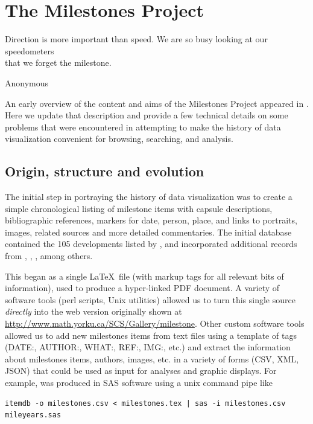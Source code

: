 \section{The Milestones Project}\label{sec:project}
\epigraph{Direction is more important than speed. We are so busy looking at our speedometers \\ that we forget the milestone.}{Anonymous} %

An early overview of the content and aims of the Milestones Project appeared in \cite{Friendly:04:gfkl}. Here we update that description and provide a few technical details on some problems that were encountered in attempting to make the history of data visualization convenient for browsing, searching, and analysis.

\subsection{Origin, structure and evolution}\label{sec:structure}
The initial step in portraying the history of data visualization was to create a simple chronological listing of milestone items with capsule descriptions, bibliographic references, markers for date, person, place, and links to portraits, images, related sources and more detailed commentaries. The initial database contained the 105 developments listed by \citet{BenigerRobyn:1978}, and incorporated additional records from \citet{Hankins:1999}, \citet{Tufte:1983,Tufte:1990,Tufte:1997}, \citet{Heiser:2000}, among others.

This began as a single \LaTeX\ file (with markup tags for all relevant bits of information), used to produce a hyper-linked PDF document.  A variety of software tools (perl scripts, Unix utilities) allowed us to turn this single source \emph{directly} into the web version originally shown at
\url{http://www.math.yorku.ca/SCS/Gallery/milestone}.  Other custom software tools allowed us to add new milestones items from text files using a template of tags (DATE:, AUTHOR:, WHAT:, REF:, IMG:, etc.) and extract the information about milestones items, authors, images, etc. in a variety of forms (CSV, XML, JSON) that could be used as input for analyses and graphic displays.  For example,  was produced in SAS software using a unix command pipe like 
\begin{verbatim} 
itemdb -o milestones.csv < milestones.tex | sas -i milestones.csv mileyears.sas 
\end{verbatim}

